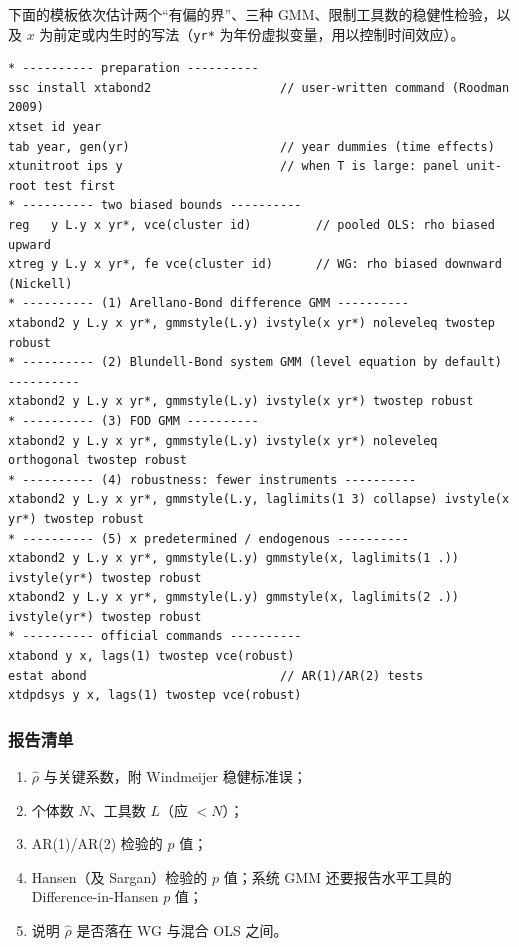 下面的模板依次估计两个“有偏的界”、三种 GMM、限制工具数的稳健性检验，以及 $x$ 为前定或内生时的写法（\texttt{yr*} 为年份虚拟变量，用以控制时间效应）。
\begin{lstlisting}
* ---------- preparation ----------
ssc install xtabond2                  // user-written command (Roodman 2009)
xtset id year
tab year, gen(yr)                     // year dummies (time effects)
xtunitroot ips y                      // when T is large: panel unit-root test first
* ---------- two biased bounds ----------
reg   y L.y x yr*, vce(cluster id)         // pooled OLS: rho biased upward
xtreg y L.y x yr*, fe vce(cluster id)      // WG: rho biased downward (Nickell)
* ---------- (1) Arellano-Bond difference GMM ----------
xtabond2 y L.y x yr*, gmmstyle(L.y) ivstyle(x yr*) noleveleq twostep robust
* ---------- (2) Blundell-Bond system GMM (level equation by default) ----------
xtabond2 y L.y x yr*, gmmstyle(L.y) ivstyle(x yr*) twostep robust
* ---------- (3) FOD GMM ----------
xtabond2 y L.y x yr*, gmmstyle(L.y) ivstyle(x yr*) noleveleq orthogonal twostep robust
* ---------- (4) robustness: fewer instruments ----------
xtabond2 y L.y x yr*, gmmstyle(L.y, laglimits(1 3) collapse) ivstyle(x yr*) twostep robust
* ---------- (5) x predetermined / endogenous ----------
xtabond2 y L.y x yr*, gmmstyle(L.y) gmmstyle(x, laglimits(1 .)) ivstyle(yr*) twostep robust
xtabond2 y L.y x yr*, gmmstyle(L.y) gmmstyle(x, laglimits(2 .)) ivstyle(yr*) twostep robust
* ---------- official commands ----------
xtabond y x, lags(1) twostep vce(robust)
estat abond                           // AR(1)/AR(2) tests
xtdpdsys y x, lags(1) twostep vce(robust)
\end{lstlisting}

\subsubsection{报告清单}

\begin{method}
\begin{enumerate}
  \item $\hat\rho$ 与关键系数，附 Windmeijer 稳健标准误；
  \item 个体数 $N$、工具数 $L$（应 $<N$）；
  \item AR(1)/AR(2) 检验的 $p$ 值；
  \item Hansen（及 Sargan）检验的 $p$ 值；系统 GMM 还要报告水平工具的 Difference-in-Hansen $p$ 值；
  \item 说明 $\hat\rho$ 是否落在 WG 与混合 OLS 之间。
\end{enumerate}
\end{method}

